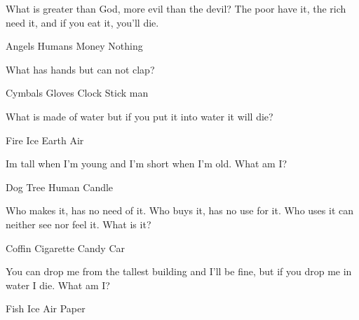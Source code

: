 \begin{questions}

\question What is greater than God, more evil than the devil? The poor have it, the rich need it, and if you eat it, you'll die.  
\begin{multicols}{4}
\begin{choices}  
\choice Angels
\choice Humans
\choice Money 
\CorrectChoice Nothing
\end{choices}
\end{multicols}

\question What has hands but can not clap? 
\begin{multicols}{4}
\begin{choices}  
\choice Cymbals
\choice Gloves 
\CorrectChoice Clock
\choice Stick man
\end{choices}
\end{multicols} 

\question What is made of water but if you put it into water it will die?
\begin{multicols}{4}
\begin{choices}  
\choice Fire
\CorrectChoice Ice
\choice Earth
\choice Air
\end{choices}
\end{multicols} 

\question Im tall when I'm young and I'm short when I'm old. What am I?
\begin{multicols}{4}
\begin{choices}  
\choice Dog 
\choice Tree 
\choice Human 
\CorrectChoice Candle 
\end{choices}
\end{multicols} 

\question Who makes it, has no need of it. Who buys it, has no use for it. Who uses it can neither see nor feel it. What is it? 
\begin{multicols}{4}
\begin{choices} 
\CorrectChoice Coffin
\choice Cigarette 
\choice Candy
\choice Car
\end{choices}
\end{multicols} 

\question You can drop me from the tallest building and I'll be fine, but if you drop me in water I die. What am I? 
\begin{multicols}{4}
\begin{choices} 
\choice Fish
\choice Ice
\choice Air
\CorrectChoice Paper
\end{choices}
\end{multicols} 


\end{questions}
